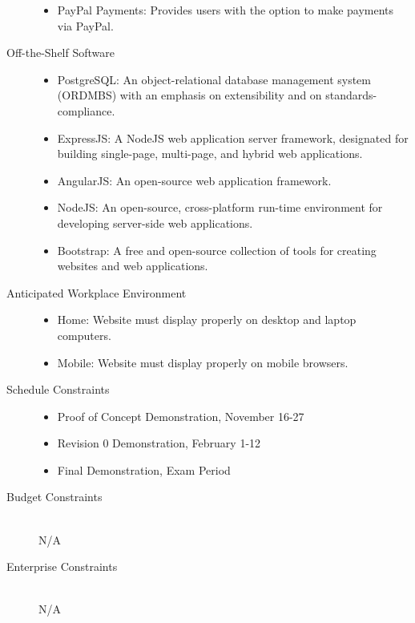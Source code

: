 \documentclass[12pt, titlepage]{article}
\begin{document}
\begin{description}
\begin{itemize}
    \item PayPal Payments: Provides users with the option to make payments
          via PayPal. \\
    \end{itemize}
  \item[Off-the-Shelf Software] \hfill 
    \begin{itemize}
    \item PostgreSQL: An object-relational database management system (ORDMBS)
      with an emphasis on extensibility and on standards-compliance.
    \item ExpressJS: A NodeJS web application server framework, designated for
      building single-page, multi-page, and hybrid web applications.
    \item AngularJS: An open-source web application framework.
    \item NodeJS: An open-source, cross-platform run-time environment for
      developing server-side web applications.
    \item Bootstrap: A free and open-source collection of tools for creating
      websites and web applications. \\
    \end{itemize}
  \item[Anticipated Workplace Environment] \hfill 
    \begin{itemize}
    \item Home: Website must display properly on desktop and laptop computers.
    \item Mobile: Website must display properly on mobile browsers. \\
    \end{itemize}
  \item[Schedule Constraints] \hfill 
    \begin{itemize}
    \item Proof of Concept Demonstration, November 16-27
    \item Revision 0 Demonstration, February 1-12
    \item Final Demonstration, Exam Period
    \end{itemize}
  \item[Budget Constraints] \hfill \\
    N/A
  \item[Enterprise Constraints] \hfill \\
    N/A
\end{description}
\end{document}

